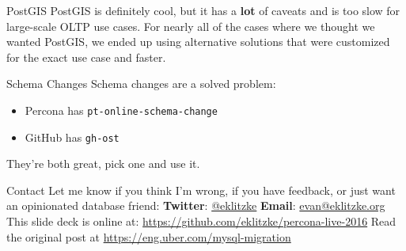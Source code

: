\documentclass[14pt]{beamer}
\begin{document}
\begin{frame}{PostGIS}
  PostGIS is definitely cool, but it has a \textbf{lot} of caveats and is too
  slow for large-scale OLTP use cases.
  \newline
  \newline
  For nearly all of the cases where we thought we wanted PostGIS, we ended up
  using alternative solutions that were customized for the exact use case and
  faster.
\end{frame}

\begin{frame}{Schema Changes}
  Schema changes are a solved problem:
  \begin{itemize}
    \item Percona has \texttt{pt-online-schema-change}
    \item GitHub has \texttt{gh-ost}
  \end{itemize}
  They're both great, pick one and use it.
\end{frame}

\begin{frame}{Contact}
  Let me know if you think I'm wrong, if you have feedback, or just want an
  opinionated database friend:
  \newline
  \newline
  \textbf{Twitter}: \href{https://twitter.com/eklitzke}{@eklitzke}
  \newline
  \textbf{Email}: \href{mailto:evan@eklitzke.org}{evan@eklitzke.org}
  \newline
  \newline
  This slide deck is online at:
  \href{https://github.com/eklitzke/percona-live-2016}{https://github.com/eklitzke/percona-live-2016}
  \newline
  \newline
  Read the original post at
  \href{https://eng.uber.com/mysql-migration}{https://eng.uber.com/mysql-migration}
\end{frame}
\end{document}
